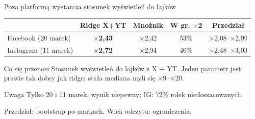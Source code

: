 \documentclass[aspectratio=169,10pt]{beamer}
\renewcommand{\x}[1]{$\times$#1}
\newcommand{\xb}[1]{\textbf{$\boldsymbol{\times}$#1}}
\begin{document}
\begin{frame}{Poza platformą wystarcza stosunek wyświetleń do lajków}
\centering\small\setlength{\tabcolsep}{6pt}\renewcommand{\arraystretch}{1.3}
\begin{tabular}{lcccc}
\toprule
 & \textbf{Ridge X+YT} & Mnożnik & W gr. \x{2} & Przedział \\
\midrule
Facebook (20 marek) & \xb{2,43} & \x{2,42} & 53\% & \x{2,08}--\x{2,99} \\
Instagram (11 marek) & \xb{2,72} & \x{2,94} & 40\% & \x{2,48}--\x{3,03} \\
\bottomrule
\end{tabular}
\vspace{6pt}
\begin{block}{Co się przenosi}
\small Stosunek wyświetleń do lajków z X + YT. Jeden parametr jest prawie tak dobry jak ridge; stała mediana myli się \x{9}--\x{20}.
\end{block}
\begin{alertblock}{Uwaga}
\small Tylko 20 i 11 marek, wynik niepewny; IG: 72\% rolek niedoszacowanych.
\end{alertblock}
\vfill
{\scriptsize\color{mut} Przedział: bootstrap po markach. Wiek odczytu: ograniczenia.}
\end{frame}
\end{document}
